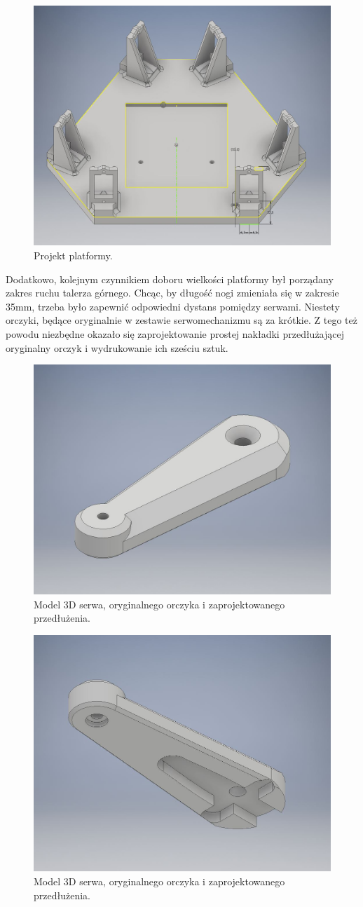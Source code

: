 \begin{figure}[!h]
    \label{fig:anzelm}
    \centering
    \includegraphics[width=0.5\linewidth]{img/Base_UP.JPG}
    \caption{Projekt platformy.}
\end{figure}

Dodatkowo, kolejnym czynnikiem doboru wielkości platformy był porządany zakres ruchu talerza górnego.
Chcąc, by długość nogi zmieniała się w zakresie 35mm, trzeba było zapewnić odpowiedni dystans pomiędzy serwami.
Niestety orczyki, będące oryginalnie w zestawie serwomechanizmu są za krótkie.
Z tego też powodu niezbędne okazało się zaprojektowanie prostej nakładki przedłużającej oryginalny orczyk i wydrukowanie ich sześciu sztuk.

\begin{figure}[!h]
    \label{fig:anzelm}
    \centering
    \includegraphics[width=0.5\linewidth]{img/serwo_orczyk_UP.JPG}
    \caption{Model 3D serwa, oryginalnego orczyka i zaprojektowanego przedłużenia.}
\end{figure}
\begin{figure}[!h]
    \label{fig:anzelm}
    \centering
    \includegraphics[width=0.5\linewidth]{img/serwo_orczyk_DOWNJPG.JPG}
    \caption{Model 3D serwa, oryginalnego orczyka i zaprojektowanego przedłużenia.}
\end{figure}


